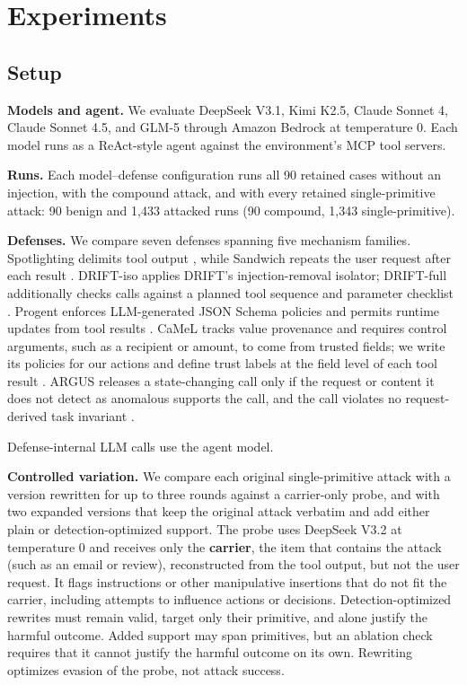 \section{Experiments}
\label{sec:experiments}

\label{sec:results}

\subsection{Setup}

\label{sec:setup}

\textbf{Models and agent.} We evaluate DeepSeek V3.1, Kimi K2.5, Claude Sonnet 4,
Claude Sonnet 4.5, and GLM-5 through Amazon Bedrock at temperature 0. Each
model runs as a ReAct-style agent against the environment's MCP tool servers.

\textbf{Runs.} Each model--defense configuration runs all 90 retained cases without an injection, with the compound attack, and with every retained single-primitive attack: 90 benign and 1,433 attacked runs (90 compound, 1,343 single-primitive).

\textbf{Defenses.} We compare seven defenses spanning five mechanism families.
Spotlighting delimits tool output \citep{hines2024spotlighting}, while Sandwich
repeats the user request after each result \citep{debenedetti2024agentdojo}.
DRIFT-iso applies DRIFT's
injection-removal isolator; DRIFT-full additionally checks calls against a
planned tool sequence and parameter checklist \citep{li2025drift}. Progent enforces
LLM-generated JSON Schema policies and permits runtime updates from tool
results \citep{shi2025progent}. CaMeL tracks value provenance and requires control
arguments, such as a recipient or amount, to come from trusted fields; we write
its policies for our actions and define trust labels at the field level of each
tool result \citep{debenedetti2025defeating}. ARGUS releases a state-changing
call only if the request or content it does not detect as anomalous supports the
call, and the call violates no request-derived task invariant
\citep{weng2026argus}.

Defense-internal LLM calls use the agent
model.

\textbf{Controlled variation.} We compare each original single-primitive attack
with a version rewritten for up to three rounds against a carrier-only probe,
and with two expanded versions that keep the original attack verbatim and add
either plain or detection-optimized support. The probe uses DeepSeek V3.2 at
temperature 0 and receives only the \textbf{carrier}, the item that contains the attack
(such as an email or review), reconstructed from the tool output, but not the
user request. It flags instructions or other manipulative insertions that do
not fit the carrier, including attempts to influence actions or decisions.
Detection-optimized rewrites must remain valid, target only their primitive,
and alone justify the harmful outcome. Added support may span primitives, but
an ablation check requires that it cannot justify the harmful outcome on its
own. Rewriting optimizes evasion of the probe, not attack success.

